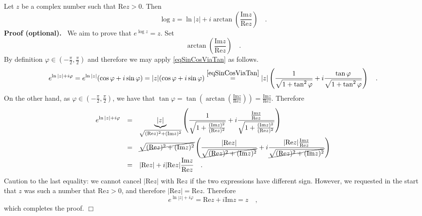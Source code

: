 \documentclass[12pt]{book}
\renewcommand{\Im}{\mathrm{Im}}
\renewcommand{\Re}{\mathrm{Re}}
\newcommand{\importantFormula}[1]{\begin{equation} \boxed{#1} \end{equation}}
\newenvironment{proofOptional}[1][]{ \textbf{Proof (optional).}}{$\Box$\medskip}
\begin{document}
Let $z$ be a complex number such that $\Re z>0$. Then
\importantFormula{
\log z = \ln |z| + i\arctan \left(\frac{\Im z}{\Re z}\right)\quad .
}
\begin{proofOptional} 
~We aim to prove that $e^{\log z}=z$. Set 
\[
\arctan \left(\frac{\Im z}{\Re z}\right)\quad .
\]
By definition $\varphi\in  (-\frac{\pi}{2}, \frac{\pi}{2})$ and therefore we may apply \eqref{eqSinCosViaTan} as follows.
\[
e^{\ln |z| + i\varphi}= e^{\ln |z|} (\cos\varphi+i\sin\varphi )=|z|(\cos\varphi+i\sin\varphi ) \stackrel{\eqref{eqSinCosViaTan}}{=} 
|z| \left(\frac{1}{\sqrt{1+\tan^2\varphi}} +i \frac{\tan \varphi}{\sqrt{1+\tan^2\varphi}} \right)\quad .
\]
On the other hand, as $\varphi\in  (-\frac{\pi}{2}, \frac{\pi}{2})$, we have that $\tan\varphi= \tan\left(\arctan\left(\frac{\Im z}{\Re z}\right)\right)= \frac{\Im z}{\Re z}$. Therefore
\[
\begin{array}{rcl}
\displaystyle e^{\ln |z| + i\varphi}&=&\displaystyle \underbrace{|z|}_{\sqrt{(\Re z)^2+(\Im z)^2}} \left(\frac{1}{\sqrt{1+\frac{(\Im z)^2}{(\Re z)^2}}} +i \frac{\frac{\Im z}{\Re z}}{\sqrt{1+\frac{(\Im z)^2}{(\Re z)^2}}} \right) \\
&=&\displaystyle \cancel{\sqrt{(\Re z)^2+(\Im z)^2}} \left(\frac{|\Re z|}{\cancel{\sqrt{(\Re z)^2+(\Im z)^2}}} +i \frac{|\Re z|\frac{\Im z}{\Re z}}{\cancel{\sqrt{(\Re z)^2+(\Im z)^2}}} \right) \\
&=&\displaystyle|\Re z | + i|\Re z| \frac{\Im z}{\Re z}\quad .
\end{array}
\]
Caution to the last equality: we cannot cancel $|\Re z| $ with $\Re z$ if the two expressions have different sign. However, we requested in the start that $z$ was such a number that $\Re z>0$, and therefore $|\Re z|=\Re z $. Therefore 
\[
e^{\ln |z| + i\varphi}=\Re z+i\Im z = z\quad ,
\]
which completes the proof.
\end{proofOptional}
\end{document}
